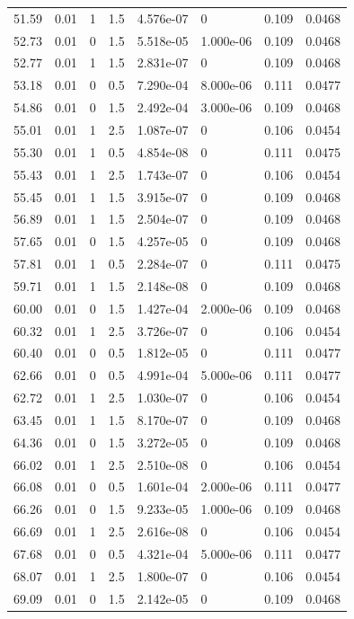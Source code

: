 \documentclass[preview]{standalone}
\begin{document}
{{{\begin{tabular}{L{1.2cm}C{1.2cm} C{0.3cm}C{0.5cm} C{1.4cm}C{1.4cm} C{1.4cm}C{1.4cm}}
  51.59  &  0.01  & 1     & 1.5 &  4.576e-07  & 0  & 0.109 &  0.0468   \\ 
  52.73  &  0.01  & 0     & 1.5 &  5.518e-05  & 1.000e-06  & 0.109 &  0.0468   \\ 
  52.77  &  0.01  & 1     & 1.5 &  2.831e-07  & 0  & 0.109 &  0.0468   \\ 
  53.18  &  0.01  & 0     & 0.5 &  7.290e-04  & 8.000e-06  & 0.111 &  0.0477   \\ 
  54.86  &  0.01  & 0     & 1.5 &  2.492e-04  & 3.000e-06  & 0.109 &  0.0468   \\ 
  55.01  &  0.01  & 1     & 2.5 &  1.087e-07  & 0  & 0.106 &  0.0454   \\ 
  55.30  &  0.01  & 1     & 0.5 &  4.854e-08  & 0  & 0.111 &  0.0475   \\ 
  55.43  &  0.01  & 1     & 2.5 &  1.743e-07  & 0  & 0.106 &  0.0454   \\ 
  55.45  &  0.01  & 1     & 1.5 &  3.915e-07  & 0  & 0.109 &  0.0468   \\ 
  56.89  &  0.01  & 1     & 1.5 &  2.504e-07  & 0  & 0.109 &  0.0468   \\ 
  57.65  &  0.01  & 0     & 1.5 &  4.257e-05  & 0  & 0.109 &  0.0468   \\ 
  57.81  &  0.01  & 1     & 0.5 &  2.284e-07  & 0  & 0.111 &  0.0475   \\ 
  59.71  &  0.01  & 1     & 1.5 &  2.148e-08  & 0  & 0.109 &  0.0468   \\ 
  60.00  &  0.01  & 0     & 1.5 &  1.427e-04  & 2.000e-06  & 0.109 &  0.0468   \\ 
  60.32  &  0.01  & 1     & 2.5 &  3.726e-07  & 0  & 0.106 &  0.0454   \\ 
  60.40  &  0.01  & 0     & 0.5 &  1.812e-05  & 0  & 0.111 &  0.0477   \\ 
  62.66  &  0.01  & 0     & 0.5 &  4.991e-04  & 5.000e-06  & 0.111 &  0.0477   \\ 
  62.72  &  0.01  & 1     & 2.5 &  1.030e-07  & 0  & 0.106 &  0.0454   \\ 
  63.45  &  0.01  & 1     & 1.5 &  8.170e-07  & 0  & 0.109 &  0.0468   \\ 
  64.36  &  0.01  & 0     & 1.5 &  3.272e-05  & 0  & 0.109 &  0.0468   \\ 
  66.02  &  0.01  & 1     & 2.5 &  2.510e-08  & 0  & 0.106 &  0.0454   \\ 
  66.08  &  0.01  & 0     & 0.5 &  1.601e-04  & 2.000e-06  & 0.111 &  0.0477   \\ 
  66.26  &  0.01  & 0     & 1.5 &  9.233e-05  & 1.000e-06  & 0.109 &  0.0468   \\ 
  66.69  &  0.01  & 1     & 2.5 &  2.616e-08  & 0  & 0.106 &  0.0454   \\ 
  67.68  &  0.01  & 0     & 0.5 &  4.321e-04  & 5.000e-06  & 0.111 &  0.0477   \\ 
  68.07  &  0.01  & 1     & 2.5 &  1.800e-07  & 0  & 0.106 &  0.0454   \\ 
  69.09  &  0.01  & 0     & 1.5 &  2.142e-05  & 0  & 0.109 &  0.0468   \\ 
\hline 
\end{tabular} 

}}}
\end{document}
